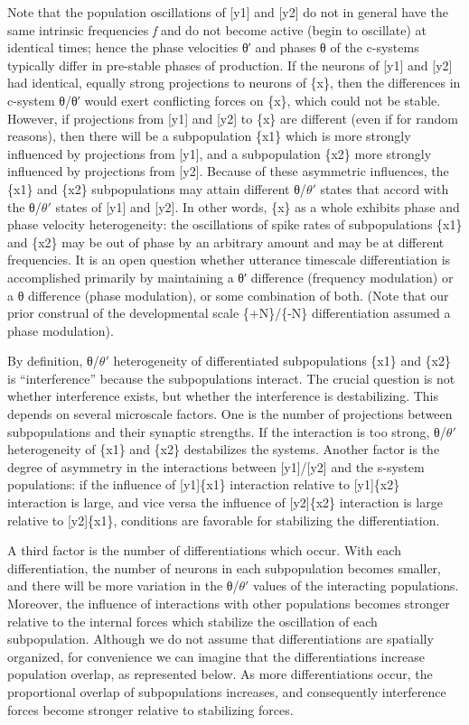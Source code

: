  Note that the population oscillations of [y1] and [y2] do not in general have the same intrinsic frequencies \textit{f} and do not become active (begin to oscillate) at identical times; hence the phase velocities θ′ and phases θ of the c-systems typically differ in pre-stable phases of production. If the neurons of [y1] and [y2] had identical, equally strong projections to neurons of \{x\}, then the differences in c-system θ/θ′ would exert conflicting forces on \{x\}, which could not be stable. However, if projections from [y1] and [y2] to \{x\} are different (even if for random reasons), then there will be a subpopulation \{x1\} which is more strongly influenced by projections from [y1], and a subpopulation \{x2\} more strongly influenced by projections from [y2]. Because of these asymmetric influences, the \{x1\} and \{x2\} subpopulations may attain different θ/$\theta ′$ states that accord with the θ/$\theta ′$ states of [y1] and [y2]. In other words, \{x\} as a whole exhibits phase and phase velocity heterogeneity: the oscillations of spike rates of subpopulations \{x1\} and \{x2\} may be out of phase by an arbitrary amount and may be at different frequencies. It is an open question whether utterance timescale differentiation is accomplished primarily by maintaining a θ′ difference (frequency modulation) or a θ difference (phase modulation), or some combination of both. (Note that our prior construal of the developmental scale \{+N\}/\{-N\} differentiation assumed a phase modulation).

  By definition, θ/$\theta ′$ heterogeneity of differentiated subpopulations \{x1\} and \{x2\} is “interference” because the subpopulations interact. The crucial question is not whether interference exists, but whether the interference is destabilizing. This depends on several microscale factors. One is the number of projections between subpopulations and their synaptic strengths. If the interaction is too strong, θ/$\theta ′$ heterogeneity of \{x1\} and \{x2\} destabilizes the systems. Another factor is the degree of asymmetry in the interactions between [y1]/[y2] and the s-system populations: if the influence of [y1]\{x1\} interaction relative to [y1]\{x2\} interaction is large, and vice versa the influence of  [y2]\{x2\} interaction is large relative to [y2]\{x1\}, conditions are favorable for stabilizing the differentiation.

  A third factor is the number of differentiations which occur. With each differentiation, the number of neurons in each subpopulation becomes smaller, and there will be more variation in the θ/$\theta ′$ values of the interacting populations. Moreover, the influence of interactions with other populations becomes stronger relative to the internal forces which stabilize the oscillation of each subpopulation.  Although we do not assume that differentiations are spatially organized, for convenience we can imagine that the differentiations increase population overlap, as represented below. As more differentiations occur, the proportional overlap of subpopulations increases, and consequently interference forces become stronger relative to stabilizing forces.

